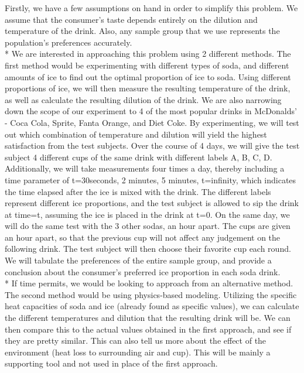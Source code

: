 \documentclass[oneside,12pt]{report}
\begin{document}
Firstly, we have a few assumptions on hand in order to simplify this problem. We assume that the consumer's taste depends entirely on the dilution and temperature of the drink. Also, any sample group that we use represents the population's preferences accurately.
\\* We are interested in approaching this problem using 2 different methods. The first method would be experimenting with different types of soda, and different amounts of ice to find out the optimal proportion of ice to soda. Using different proportions of ice, we will then measure the resulting temperature of the drink, as well as calculate the resulting dilution of the drink. We are also narrowing down the scope of our experiment to 4 of the most popular drinks in McDonalds' - Coca Cola, Sprite, Fanta Orange, and Diet Coke. By experimenting, we will test out which combination of temperature and dilution will yield the highest satisfaction from the test subjects. Over the course of 4 days, we will give the test subject 4 different cups of the same drink with different labels A, B, C, D. Additionally, we will take measurements four times a day, thereby including a time parameter of t=30seconds, 2 minutes, 5 minutes, t=infinity, which indicates the time elapsed after the ice is mixed with the drink. The different labels represent different ice proportions, and the test subject is allowed to sip the drink at time=t, assuming the ice is placed in the drink at t=0. On the same day, we will do the same test with the 3 other sodas, an hour apart. The cups are given an hour apart, so that the previous cup will not affect any judgement on the following drink. The test subject will then choose their favorite cup each round. We will tabulate the preferences of the entire sample group, and provide a conclusion about the consumer's preferred ice proportion in each soda drink.
\\* If time permits, we would be looking to approach from an alternative method. The second method would be using physics-based modeling. Utilizing the specific heat capacities of soda and ice (already found as specific values), we can calculate the different temperatures and dilution that the resulting drink will be. We can then compare this to the actual values obtained in the first approach, and see if they are pretty similar. This can also tell us more about the effect of the environment (heat loss to surrounding air and cup). This will be mainly a supporting tool and not used in place of the first approach.

%
\end{document}
